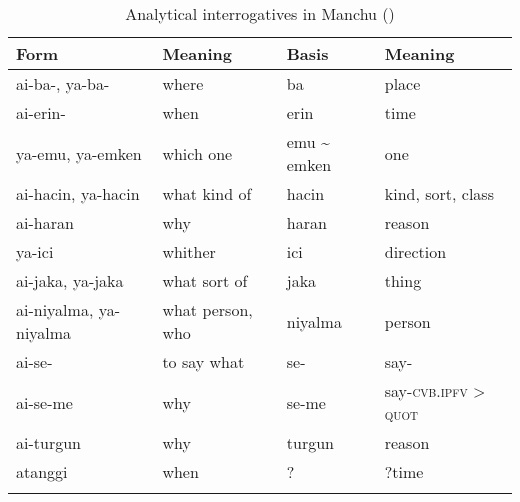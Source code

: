 \begin{table}[t]
\caption{Analytical interrogatives in Manchu (\citealt{Hauer2007,Norman2013,Hölzl2015c})}
\label{tab:tungu:33}

\begin{tabularx}{\textwidth}{llXl}
\lsptoprule

\textbf{Form} & \textbf{Meaning} & \textbf{Basis} & \textbf{Meaning}\\
\midrule
ai-ba-, ya-ba- & where & ba & place\\
ai-erin- & when & erin & time\\
ya-emu, ya-emken & which one & emu {\textasciitilde} emken & one\\
ai-hacin, ya-hacin & what kind of & hacin & kind, sort, class\\
ai-haran & why & haran & reason\\
ya-ici & whither & ici & direction\\
ai-jaka, ya-jaka & what sort of & jaka & thing\\
ai-niyalma, ya-niyalma & what person, who & niyalma & person\\
ai-se- & to say what & se- & say-\\
ai-se-me & why & se-me & say-\textsc{cvb.ipfv} > \textsc{quot}\\
ai-turgun & why & turgun & reason\\
atanggi & when & ? & ?time\\
\lspbottomrule
\end{tabularx}
\end{table}

